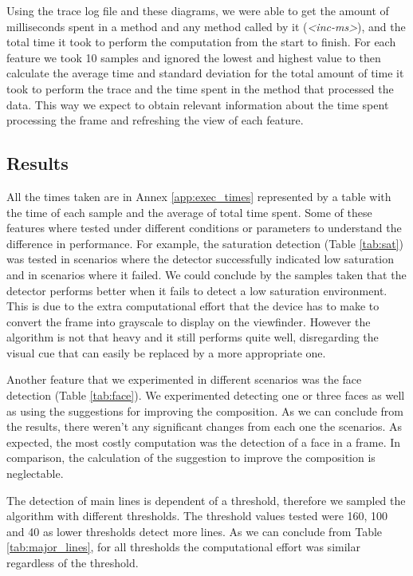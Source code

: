 Using the trace log file and these diagrams, we were able to get the amount of milliseconds spent in a method and any method called by it (\emph{<inc-ms>}), and the total time it took to perform the computation from the start to finish.
For each feature we took 10 samples and ignored the lowest and highest value to then calculate the average time and standard deviation for the total amount of time it took to perform the trace and the time spent in the method that processed the data. This way we expect to obtain relevant information about the time spent processing the frame and refreshing the view of each feature.

\subsection{Results}

All the times taken are in Annex \ref{app:exec_times} represented by a table with the time of each sample and the average of total time spent.
Some of these features where tested under different conditions or parameters to understand the difference in performance. For example, the saturation detection (Table \ref{tab:sat}) was tested in scenarios where the detector successfully indicated low saturation and in scenarios where it failed. We could conclude by the samples taken that the detector performs better when it fails to detect a low saturation environment. This is due to the extra computational effort that the device has to make to convert the frame into grayscale to display on the viewfinder. However the algorithm is not that heavy and it still performs quite well, disregarding the visual cue that can easily be replaced by a more appropriate one.

Another feature that we experimented in different scenarios was the face detection (Table \ref{tab:face}). We experimented detecting one or three faces as well as using the suggestions for improving the composition. As we can conclude from the results, there weren't any significant changes from each one the scenarios. As expected, the most costly computation was the detection of a face in a frame. In comparison, the calculation of the suggestion to improve the composition is neglectable.

The detection of main lines is dependent of a threshold, therefore we sampled the algorithm with different thresholds. The threshold values tested were 160, 100 and 40 as lower thresholds detect more lines. As we can conclude from Table \ref{tab:major_lines}, for all thresholds the computational effort was similar regardless of the threshold.

